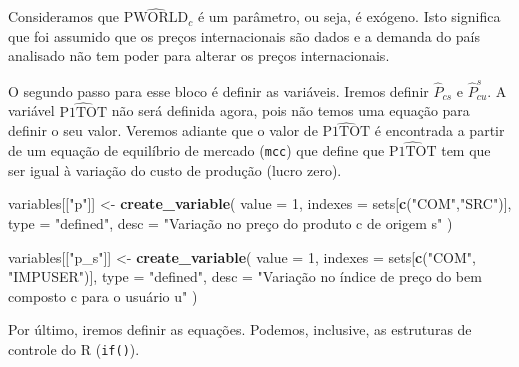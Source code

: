 \documentclass[12pt,twoside]{article}
\newenvironment{Shaded}{\begin{snugshade}}{\end{snugshade}}
\newcommand{\DataTypeTok}[1]{\textcolor[rgb]{0.13,0.29,0.53}{#1}}
\newcommand{\DecValTok}[1]{\textcolor[rgb]{0.00,0.00,0.81}{#1}}
\newcommand{\KeywordTok}[1]{\textcolor[rgb]{0.13,0.29,0.53}{\textbf{#1}}}
\newcommand{\NormalTok}[1]{#1}
\newcommand{\StringTok}[1]{\textcolor[rgb]{0.31,0.60,0.02}{#1}}
\let\oldShaded\Shaded
\let\endoldShaded\endShaded
\renewenvironment{Shaded}{\footnotesize\oldShaded}{\endoldShaded}
\begin{document}
Consideramos que \(\hat{\text{PWORLD}}_c\) é um parâmetro, ou seja, é
exógeno. Isto significa que foi assumido que os preços internacionais
são dados e a demanda do país analisado não tem poder para alterar os
preços internacionais.

O segundo passo para esse bloco é definir as variáveis. Iremos definir
\(\hat{P}_{cs}\) e \(\hat{P}^s_{cu}\). A variável \(\hat{\text{P1TOT}}\)
não será definida agora, pois não temos uma equação para definir o seu
valor. Veremos adiante que o valor de \(\hat{\text{P1TOT}}\) é
encontrada a partir de um equação de equilíbrio de mercado
(\texttt{mcc}) que define que \(\hat{\text{P1TOT}}\) tem que ser igual à
variação do custo de produção (lucro zero).

\begin{Shaded}
\begin{Highlighting}[]
\NormalTok{variables[[}\StringTok{"p"}\NormalTok{]] <-}\StringTok{ }\KeywordTok{create_variable}\NormalTok{(}
  \DataTypeTok{value =} \DecValTok{1}\NormalTok{,}
  \DataTypeTok{indexes =}\NormalTok{ sets[}\KeywordTok{c}\NormalTok{(}\StringTok{"COM"}\NormalTok{,}\StringTok{"SRC"}\NormalTok{)],}
  \DataTypeTok{type =} \StringTok{"defined"}\NormalTok{,}
  \DataTypeTok{desc =} \StringTok{"Variação no preço do produto c de origem s"}
\NormalTok{)}

\NormalTok{variables[[}\StringTok{"p_s"}\NormalTok{]] <-}\StringTok{ }\KeywordTok{create_variable}\NormalTok{(}
  \DataTypeTok{value =} \DecValTok{1}\NormalTok{,}
  \DataTypeTok{indexes =}\NormalTok{ sets[}\KeywordTok{c}\NormalTok{(}\StringTok{"COM"}\NormalTok{, }\StringTok{"IMPUSER"}\NormalTok{)],}
  \DataTypeTok{type =} \StringTok{"defined"}\NormalTok{,}
  \DataTypeTok{desc =} \StringTok{"Variação no índice de preço do bem composto c para o usuário u"}
\NormalTok{)}
\end{Highlighting}
\end{Shaded}

Por último, iremos definir as equações. Podemos, inclusive, as
estruturas de controle do R (\texttt{if()}).
\end{document}
